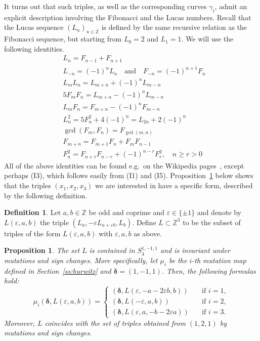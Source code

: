 \documentclass[11pt,a4paper]{amsart}
\newcommand{\Z}{\mathbb Z}
\newcommand{\de}{\delta}
\newcommand{\ep}{\varepsilon}
\newcommand{\ga}{\gamma}
\newcommand{\bde}{\bm{\de}}
\newtheorem{prop}[thm]{Proposition}
\theoremstyle{definition}
\newtheorem{defn}[thm]{Definition}
\numberwithin{equation}{section}
\begin{document}
It turns out that such triples, as well as the corresponding curves $\ga_i$, admit an explicit description involving the Fibonacci and the Lucas numbers. 
Recall that the Lucas sequence $(L_n)_{n \in \Z}$ is defined by the same recursive relation as the Fibonacci sequence, but starting from $L_0=2$ and $L_1=1$. We will use the following identities. 
\begin{align}\label{e:lucas} 
& L_n = F_{n-1}+F_{n+1}\tag{I1} \\
& L_{-n} = (-1)^n L_n\quad\text{and}\quad F_{-n}=(-1)^{n+1}F_n\tag{I2} \\
& L_m L_n = L_{m+n}+(-1)^n L_{m-n}\tag{I3} \\
& 5F_m F_n=L_{m+n}-(-1)^n L_{m-n}\tag{I4} \\
& L_mF_n=F_{m+n}-(-1)^n F_{m-n}\tag{I5} \\
& L_n^2=5F_n^2+4(-1)^n=L_{2n}+2(-1)^n\tag{I6}\\
& \gcd(F_m,F_n) = F_{\gcd(m,n)}\tag{I7}\\
& F_{m+n} = F_{m+1} F_n + F_m F_{n-1}\tag{I8}\\
& F_n^2 = F_{n+r} F_{n-r} + (-1)^{n-r} F_r^2,\quad n\geq r>0\tag{I9}
\end{align}
All of the above identities can be found e.g.~on the Wikipedia pages~\cite{Wifib, Wiluc}, except perhaps (I3), which follows easily from (I1) and (I5). 
Proposition~\ref{p:lucas-triples} below shows that the triples $(x_1,x_2,x_3)$ we 
are interested in have a specific form, described by the following definition. 
\begin{defn}
Let $a,b\in\Z$ be odd and coprime and $\ep \in \{\pm 1\}$ and denote by $L(\ep,a,b)$ 
the triple $(L_a,-\ep L_{a+\ep b},L_b)$. Define $L\subset\Z^3$ to be the subset of triples 
of the form $L(\ep,a,b)$ with $\ep,a,b$ as above. 
\end{defn}
\begin{prop}\label{p:lucas-triples}
The set $L$ is contained in $S_4^{1,-1,1}$ and is invariant under mutations and sign changes. 
More specifically, let $\mu_i$ be the $i$-th mutation map defined in Section~\ref{ss:hurwitz} and $\bde = (1,-1,1)$. Then, the following formulas hold:
\[
\mu_i(\bde, L(\ep,a,b))=
\begin{cases}
(\bde, L(\ep,-a-2\ep b,b)) & \text{if $i=1$,} \\
(\bde, L(-\ep,a,b))\quad & \text{if $i=2$},\\
(\bde, L(\ep,a,-b-2\ep a))\quad & \text{if $i=3$.} 
\end{cases}
\]
Moreover, $L$ coincides with the set of triples obtained from $(1,2,1)$ by mutations and sign changes.
\end{prop}
\end{document}
